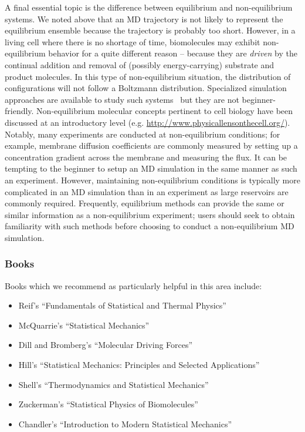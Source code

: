 \documentclass[9pt,bestpractices]{livecoms}
\begin{document}
A final essential topic is the difference between equilibrium and non-equilibrium systems.
We noted above that an MD trajectory is not likely to represent the equilibrium ensemble because the trajectory is probably too short.
However, in a living cell where there is no shortage of time, biomolecules may exhibit non-equilibrium behavior for a quite different reason -- because they are \emph{driven} by the continual addition and removal of (possibly energy-carrying) substrate and product molecules.
In this type of non-equilibrium situation, the distribution of configurations will not follow a Boltzmann distribution.
Specialized simulation approaches are available to study such systems~\cite{Chong:2017:CurrentOpinioninStructuralBiology,  Zuckerman:2017:AnnuRevBiophys} but they are not beginner-friendly.
Non-equilibrium molecular concepts pertinent to cell biology have been discussed at an introductory level (e.g. \url{http://www.physicallensonthecell.org/}).
Notably, many experiments are conducted at non-equilibrium conditions; for example, membrane diffusion coefficients are commonly measured by setting up a concentration gradient across the membrane and measuring the flux.
It can be tempting to the beginner to setup an MD simulation in the same manner as such an experiment.
However, maintaining non-equilibrium conditions is typically more complicated in an MD simulation than in an experiment as large reservoirs are commonly required.
Frequently, equilibrium methods can provide the same or similar information as a non-equilibrium experiment; users should seek to obtain familiarity with such methods before choosing to conduct a non-equilibrium MD simulation.


\subsubsection{Books}

Books which we recommend as particularly helpful in this area include:
\begin{itemize}
\item Reif's ``Fundamentals of Statistical and Thermal Physics''~\cite{Reif:2009:}
\item McQuarrie's ``Statistical Mechanics''~\cite{McQuarrie:2000:}
\item Dill and Bromberg's ``Molecular Driving Forces''~\cite{DillBook}
\item Hill's ``Statistical Mechanics: Principles and Selected Applications''~\cite{Hill:1987:}
\item Shell's ``Thermodynamics and Statistical Mechanics''~\cite{ShellBook}
\item Zuckerman's ``Statistical Physics of Biomolecules''~\cite{Zuckerman:2010:}
\item Chandler's ``Introduction to Modern Statistical Mechanics''~\cite{Chandler:1987:}
\end{itemize}
\end{document}
